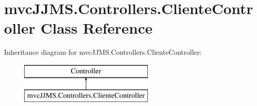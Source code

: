 \hypertarget{classmvc_j_j_m_s_1_1_controllers_1_1_cliente_controller}{}\section{mvc\+J\+J\+M\+S.\+Controllers.\+Cliente\+Controller Class Reference}
\label{classmvc_j_j_m_s_1_1_controllers_1_1_cliente_controller}
Inheritance diagram for mvc\+J\+J\+M\+S.\+Controllers.\+Cliente\+Controller\+:\begin{figure}[H]
\begin{center}
\leavevmode
\includegraphics[height=2.000000cm]{classmvc_j_j_m_s_1_1_controllers_1_1_cliente_controller}
\end{center}
\end{figure}
